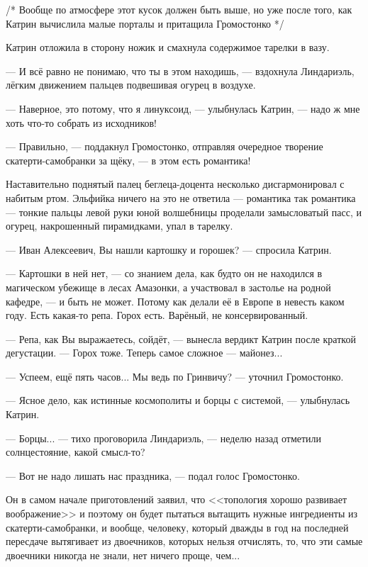 
/* Вообще по атмосфере этот кусок должен быть выше, но уже после того,
как Катрин вычислила малые порталы и притащила Громостонко */


Катрин отложила в сторону ножик и смахнула содержимое тарелки в вазу.

--- И всё равно не понимаю, что ты в этом находишь, --- вздохнула Линдариэль,
лёгким движением пальцев подвешивая огурец в воздухе.

--- Наверное, это потому, что я линуксоид, --- улыбнулась Катрин, --- надо ж мне хоть что-то собрать из исходников!

--- Правильно, --- поддакнул Громостонко, отправляя очередное творение скатерти-самобранки за щёку, --- в этом есть романтика!

Наставительно поднятый палец беглеца-доцента несколько дисгармонировал с набитым ртом.
Эльфийка ничего на это не ответила --- романтика так романтика ---
тонкие пальцы левой руки юной волшебницы проделали замысловатый пасс, и огурец, накрошенный пирамидками, упал в тарелку.

--- Иван Алексеевич, Вы нашли картошку и горошек? --- спросила Катрин.

--- Картошки в ней нет, --- со знанием дела, как будто он не находился в магическом убежище в лесах Амазонки,
а участвовал в застолье на родной кафедре, --- и быть не может. Потому как делали её в Европе в невесть каком году.
Есть какая-то репа. Горох есть. Варёный, не консервированный.

--- Репа, как Вы выражаетесь, сойдёт, --- вынесла вердикт Катрин после краткой дегустации.
--- Горох тоже. Теперь самое сложное --- майонез...

--- Успеем, ещё пять часов... Мы ведь по Гринвичу? --- уточнил Громостонко.

--- Ясное дело, как истинные космополиты и борцы с системой, --- улыбнулась Катрин.

--- Борцы... --- тихо проговорила Линдариэль, --- неделю назад отметили солнцестояние, какой смысл-то?

--- Вот не надо лишать нас праздника, --- подал голос Громостонко.

Он в самом начале приготовлений заявил, что <<топология хорошо развивает воображение>>
и поэтому он будет пытаться вытащить нужные ингредиенты из скатерти-самобранки, и вообще, человеку,
который дважды в год на последней пересдаче вытягивает из двоечников, которых нельзя отчислять, то,
что эти самые двоечники никогда не знали, нет ничего проще, чем...


